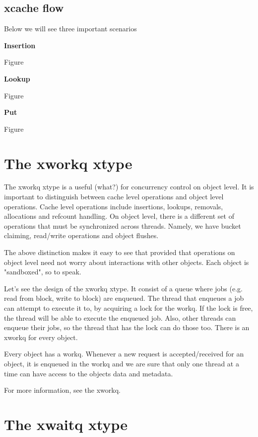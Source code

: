 \subsection{xcache flow}

Below we will see three important scenarios

\textbf{Insertion}

Figure

\textbf{Lookup}

Figure

\textbf{Put}

Figure

\section{The xworkq xtype}

The xworkq xtype is a useful (what?) for concurrency control on object level. It 
is important to distinguish between cache level operations and object level 
operations. Cache level operations include insertions, lookups, removals, 
allocations and refcount handling. On object level, there is a different set of 
operations that must be synchronized across threads. Namely, we have bucket 
claiming, read/write operations and object flushes.

The above distinction makes it easy to see that provided that operations on 
object level need not worry about interactions with other objects. Each object 
is "sandboxed", so to speak.

Let's see the design of the xworkq xtype. It consist of a queue where jobs (e.g.  
read from block, write to block) are enqueued. The thread that enqueues a job 
can attempt to execute it to, by acquiring a lock for the workq. If the lock is 
free, the thread will be able to execute the enqueued job. Also, other threads 
can enqueue their jobs, so the thread that has the lock can do those too. There 
is an xworkq for every object.

Every object has a workq. Whenever a new request is accepted/received for an
object, it is enqueued in the workq and we are sure that only one thread at a
time can have access to the objects data and metadata.

For more information, see the xworkq.

\section{The xwaitq xtype}

